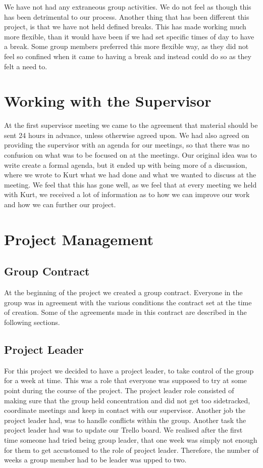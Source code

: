 \documentclass{article}
\begin{document}
We have not had any extraneous group activities. 
We do not feel as though this has been detrimental to our process.
Another thing that has been different this project, is that we have not held defined breaks. 
This has made working much more flexible, than it would have been if we had set specific times of day to have a break. 
Some group members preferred this more flexible way, as they did not feel so confined when it came to having a break and instead could do so as they felt a need to.

\section{Working with the Supervisor}
At the first supervisor meeting we came to the agreement that material should be sent 24 hours in advance, unless otherwise agreed upon. 
We had also agreed on providing the supervisor with an agenda for our meetings, so that there was no confusion on what was to be focused on at the meetings. 
Our original idea was to write create a formal agenda, but it ended up with being more of a discussion, where we wrote to Kurt what we had done and what we wanted to discuss at the meeting. 
We feel that this has gone well, as we feel that at every meeting we held with Kurt, we received a lot of information as to how we can improve our work and how we can further our project.

\section{Project Management}
\subsection{Group Contract}
At the beginning of the project we created a group contract. 
Everyone in the group was in agreement with the various conditions the contract set at the time of creation. 
Some of the agreements made in this contract are described in the following sections.

\subsection{Project Leader}
For this project we decided to have a project leader, to take control of the group for a week at time. 
This was a role that everyone was supposed to try at some point during the course of the project. 
The project leader role consisted of making sure that the group held concentration and did not get too sidetracked, coordinate meetings and keep in contact with our supervisor. 
Another job the project leader had, was to handle conflicts within the group. 
Another task the project leader had was to update our Trello board.
We realised after the first time someone had tried being group leader, that one week was simply not enough for them to get accustomed to the role of project leader.
Therefore, the number of weeks a group member had to be leader was upped to two.
\end{document}
